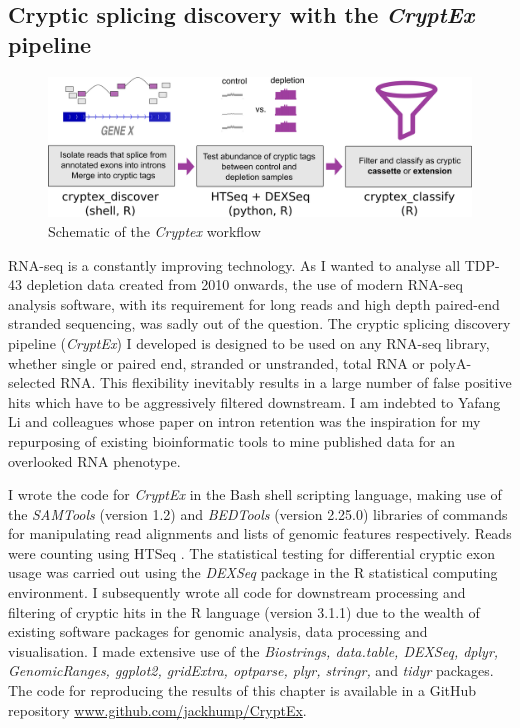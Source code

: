\subsection{Cryptic splicing discovery with the \emph{CryptEx} pipeline}

\begin{figure}
	\begin{center}
		\includegraphics[width=14cm]{Figures/03_cryptic_exons/cryptex_pipeline.png}
	\end{center}
	\caption{Schematic of the \textit{Cryptex} workflow}
\end{figure}


RNA-seq is a constantly improving technology. As I wanted to analyse all TDP-43 depletion data created from 2010 onwards, the use of modern RNA-seq analysis software, with its requirement for long reads and high depth paired-end stranded sequencing, was sadly out of the question. The cryptic splicing discovery pipeline (\textit{CryptEx}) I developed is designed to be used on any RNA-seq library, whether single or paired end, stranded or unstranded, total RNA or polyA-selected RNA. This flexibility inevitably results in a large number of false positive hits which have to be aggressively filtered downstream. I am indebted to Yafang Li and colleagues whose paper on intron retention \citep{Li2015-en} was the inspiration for my repurposing of existing bioinformatic tools to mine published data for an overlooked RNA phenotype.
 
I wrote the code for \textit{CryptEx} in the Bash shell scripting language, making use of the \emph{SAMTools} (version 1.2) \citep{Li2009-hm} and \emph{BEDTools} (version 2.25.0) \citep{Quinlan2010-up} libraries of commands for manipulating read alignments and lists of genomic features respectively. Reads were counting using HTSeq \citep{Anders2015-wz}. The statistical testing for differential cryptic exon usage was carried out using the \textit{DEXSeq} package \citep{Anders2012} in the R statistical computing environment. I subsequently wrote all code for downstream processing and filtering of cryptic hits in the R language (version 3.1.1) due to the wealth of existing software packages for genomic analysis, data processing and visualisation. I made extensive use of the \emph{Biostrings, data.table, DEXSeq, dplyr, GenomicRanges, ggplot2, gridExtra, optparse, plyr, stringr,} and \emph{tidyr} packages. The code for reproducing the results of this chapter is available in a GitHub repository \url{www.github.com/jackhump/CryptEx}.

